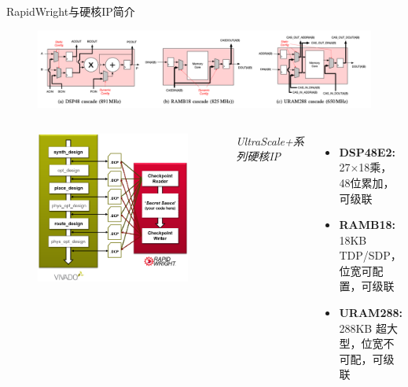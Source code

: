 \documentclass[10pt]{beamer}
\begin{document}
\begin{frame}{RapidWright与硬核IP简介}

\begin{figure}
  \includegraphics[width=1.0\textwidth]{img/hardblocks.png}
  \vspace{-0.3cm}
\end{figure}

\begin{columns}[T, onlytextwidth]
    \begin{figure}
      \includegraphics[width=\textwidth]{img/vivado_dcps.png}
    \end{figure}


    {\fontsize{7}{10}
    \emph{UltraScale+系列硬核IP}
    \begin{itemize}
      \item {\bf DSP48E2:} 27$\times$18乘，48位累加，\alert{可级联}
      \item {\bf RAMB18:} 18KB TDP/SDP，位宽可配置，\alert{可级联} 
      \item {\bf URAM288:} 288KB 超大型，位宽不可配，\alert{可级联}
    \end{itemize}

}
\end{columns}
\end{frame}
\end{document}

